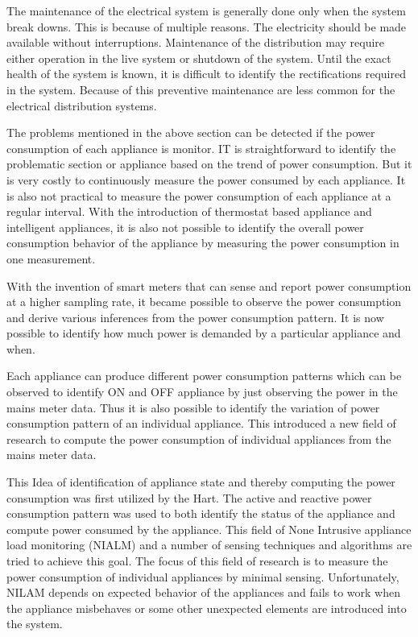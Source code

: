 The maintenance of the electrical system is generally done only when the system break downs. This is because of multiple reasons. The electricity should be made available without interruptions. Maintenance of the distribution may require either operation in the live system or shutdown of the system. Until the exact health of the system is known, it is difficult to identify the rectifications required in the system. Because of this preventive maintenance are less common for the electrical distribution systems. 

The problems mentioned in the above section can be detected if the power consumption of each appliance is monitor. IT is straightforward to identify the problematic section or appliance based on the trend of power consumption. But it is very costly to continuously measure the power consumed by each appliance. It is also not practical to measure the power consumption of each appliance at a regular interval. With the introduction of thermostat based appliance and intelligent appliances, it is also not possible to identify the overall power consumption behavior of the appliance by measuring the power consumption in one measurement. 

With the invention of smart meters that can sense and report power consumption at a higher sampling rate, it became possible to observe the power consumption and derive various inferences from the power consumption pattern. It is now possible to identify how much power is demanded by a particular appliance and when.

Each appliance can produce different power consumption patterns which can be observed to identify ON and OFF appliance by just observing the power in the mains meter data. Thus it is also possible to identify the variation of power consumption pattern of an individual appliance. This introduced a new field of research to compute the power consumption of individual appliances from the mains meter data.

This Idea of identification of appliance state and thereby computing the power consumption was first utilized by the Hart. The active and reactive power consumption pattern was used to both identify the status of the appliance and compute power consumed by the appliance. This field of None Intrusive appliance load monitoring (NIALM) and a number of sensing techniques and algorithms are tried to achieve this goal. The focus of this field of research is to measure the power consumption of individual appliances by minimal sensing. Unfortunately, NILAM depends on expected behavior of the appliances and fails to work when the appliance misbehaves or some other unexpected elements are introduced into the system.